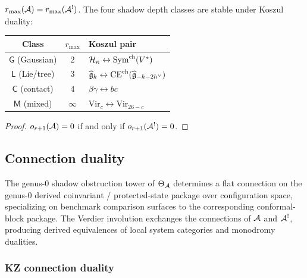 \begin{corollary}
\label{cor:thqg-IV-shadow-depth}
$r_{\max}(\mathcal{A}) = r_{\max}(\mathcal{A}^!)$.
The four shadow depth classes are stable under Koszul duality:
\begin{center}
\renewcommand{\arraystretch}{1.2}
\begin{tabular}{ccl}
\textbf{Class} & $r_{\max}$ & \textbf{Koszul pair} \\
\hline
$\mathsf{G}$ (Gaussian) & $2$ &
$\mathcal{H}_\kappa \leftrightarrow \mathrm{Sym}^{\mathrm{ch}}(V^*)$ \\
$\mathsf{L}$ (Lie/tree) & $3$ &
$\widehat{\mathfrak{g}}_k \leftrightarrow \mathrm{CE}^{\mathrm{ch}}(\widehat{\mathfrak{g}}_{-k-2h^\vee})$ \\
$\mathsf{C}$ (contact) & $4$ &
$\beta\gamma \leftrightarrow bc$ \\
$\mathsf{M}$ (mixed) & $\infty$ &
$\mathrm{Vir}_c \leftrightarrow \mathrm{Vir}_{26-c}$ \\
\end{tabular}
\end{center}
\end{corollary}

\begin{proof}
$o_{r+1}(\mathcal{A}) = 0$ if and only if $o_{r+1}(\mathcal{A}^!) = 0$.
\end{proof}

%
%

\subsection{Connection duality}

The genus-$0$ shadow obstruction tower of $\Theta_{\mathcal{A}}$ determines a flat connection
on the genus-$0$ derived coinvariant / protected-state package over
configuration space, specializing on benchmark comparison surfaces to
the corresponding conformal-block package. The Verdier
involution exchanges the connections of $\mathcal{A}$ and $\mathcal{A}^!$, producing
derived equivalences of local system categories and monodromy dualities.

\subsubsection{KZ connection duality}

